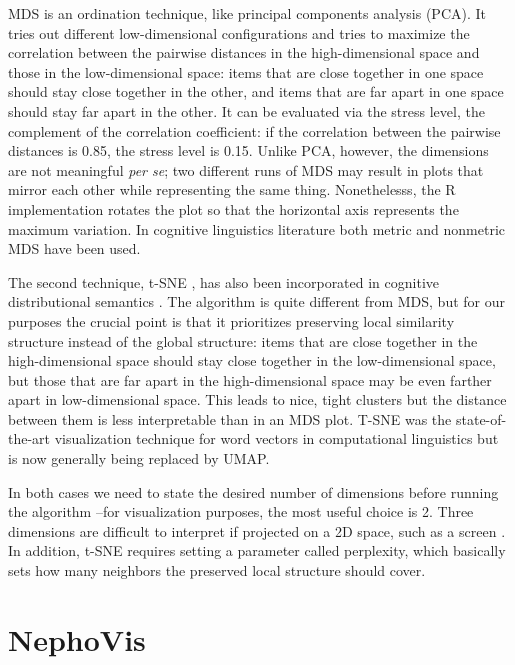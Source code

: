 \documentclass[
]{book}
\begin{document}
MDS is an ordination technique, like principal components analysis (PCA). It tries out different low-dimensional configurations and tries to maximize the correlation between the pairwise distances in the high-dimensional space and those in the low-dimensional space: items that are close together in one space should stay close together in the other, and items that are far apart in one space should stay far apart in the other.
It can be evaluated via the stress level, the complement of the correlation coefficient: if the correlation between the pairwise distances is 0.85, the stress level is 0.15.
Unlike PCA, however, the dimensions are not meaningful \emph{per se}; two different runs of MDS may result in plots that mirror each other while representing the same thing. Nonethelesss, the R implementation rotates the plot so that the horizontal axis represents the maximum variation.
In cognitive linguistics literature both metric \autocite{hilpert.correiasaavedra_2017,hilpert.flach_2020,koptjevskaja-tamm.sahlgren_2014}
and nonmetric MDS \autocite{heylen.etal_2015,heylen.etal_2012,depascale_2019,perek_2016} have been used.

The second technique, t-SNE \autocite{Rtsne2008,Rtsne2014}, has also been incorporated in cognitive distributional semantics \autocite{depascale_2019,perek_2018}.
The algorithm is quite different from MDS, but for our purposes the crucial point is that it prioritizes preserving local similarity structure instead of the global structure: items that are close together in the high-dimensional space should stay close together in the low-dimensional space, but those that are far apart in the high-dimensional space may be even farther apart in low-dimensional space. This leads to nice, tight clusters but the distance between them is less interpretable than in an MDS plot.
T-SNE was the state-of-the-art visualization technique for word vectors in computational linguistics \autocite{smilkov.etal_2016} but is now generally being replaced by UMAP.

In both cases we need to state the desired number of dimensions before running the algorithm --for visualization purposes, the most useful choice is 2. Three dimensions are difficult to interpret if projected on a 2D space, such as a screen \autocites[ 18]{card.etal_1999}[ 222]{wielfaert.etal_2019}. In addition, t-SNE requires setting a parameter called perplexity, which basically sets how many neighbors the preserved local structure should cover.

\hypertarget{nephovis}{%
\chapter{NephoVis}\label{nephovis}}
\end{document}
